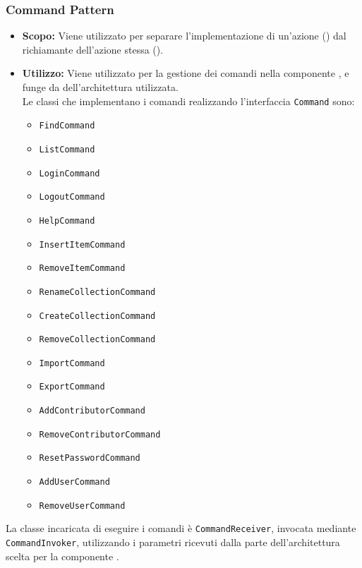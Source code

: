 \documentclass{scalatekids-article}
\begin{document}
\subsubsection{Command Pattern}

\label{sec:CommandPattern}

\begin{itemize}
\item \textbf{Scopo:} Viene utilizzato per separare l'implementazione di un'azione
  () dal richiamante dell'azione stessa ().
\item \textbf{Utilizzo:} Viene utilizzato per la gestione dei comandi nella componente
  , e funge da  dell'architettura  utilizzata.\\
  Le classi che implementano i comandi realizzando l'interfaccia \verb=Command= sono:
  \begin{itemize}
  \item \verb=FindCommand=
  \item \verb=ListCommand=
  \item \verb=LoginCommand=
  \item \verb=LogoutCommand=
  \item \verb=HelpCommand=
  \item \verb=InsertItemCommand=
  \item \verb=RemoveItemCommand=
  \item \verb=RenameCollectionCommand=
  \item \verb=CreateCollectionCommand=
  \item \verb=RemoveCollectionCommand=
  \item \verb=ImportCommand=
  \item \verb=ExportCommand=
  \item \verb=AddContributorCommand=
  \item \verb=RemoveContributorCommand=
  \item \verb=ResetPasswordCommand=
  \item \verb=AddUserCommand=
  \item \verb=RemoveUserCommand=
  \end{itemize}
\end{itemize}

La classe incaricata di eseguire i comandi è \verb=CommandReceiver=, invocata mediante
\verb=CommandInvoker=, utilizzando i parametri ricevuti dalla parte 
dell'architettura  scelta per la componente .
\end{document}
